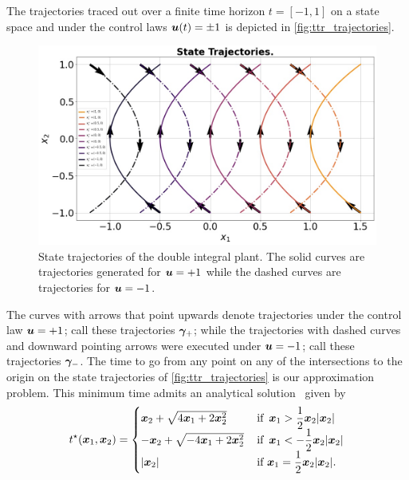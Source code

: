 The trajectories traced out over a finite time horizon $t=[-1, 1]$ on a state space and under the control laws $\bm{u}(t) = \pm 1$ is depicted in \autoref{fig:ttr_trajectories}. 
\begin{figure}[tb!]
	\centering
	\includegraphics[width=\columnwidth]{figures/doub_int_trajos.jpg}
	\caption{State trajectories of the double integral plant. The solid curves are trajectories generated for $\bm{u}=+1$ while the dashed curves are trajectories for $\bm{u} = -1$.}
	\label{fig:ttr_trajectories}
\end{figure}
%
The curves with arrows that point upwards denote trajectories under the control law  $\bm{u}=+1$; call these trajectories $\bm{\gamma}_+$; while the  trajectories with dashed curves and downward pointing arrows were executed under $\bm{u}=-1$; call these trajectories $\bm{\gamma}_-$. The time to go from any point on any of the intersections to the origin on the state trajectories of \autoref{fig:ttr_trajectories} is our approximation problem.  This minimum time admits an analytical solution~\cite{AthansFalb} given by
%
\begin{align}
	t^\star(\state_1, \state_2) = %
	\begin{cases}
		\state_2 + \sqrt{4 \state_1 + 2 \state_2^2} \, &\text{if } \, \state_1 > \dfrac{1}{2} \state_2 |\state_2| \\
		-\state_2 + \sqrt{-4 \state_1 + 2 \state_2^2} \, &\text{if }  \, \state_1 < -\dfrac{1}{2} \state_2 |\state_2| \\
		|\state_2| &\text{if } \state_1 = \dfrac{1}{2} \state_2 |\state_2|.
	\end{cases}
\end{align}


